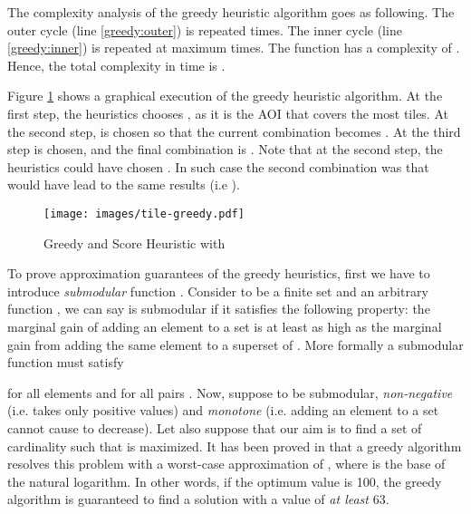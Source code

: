 \documentclass[final,10pt,a5paper]{phdimt}
\theoremstyle{definition}
\begin{document}
The complexity analysis of the greedy heuristic algorithm goes as following.
The outer cycle (line \ref{greedy:outer}) is repeated  times. 
The inner cycle (line \ref{greedy:inner}) is repeated at maximum  times. 
The function  has a complexity of .
Hence, the total complexity in time is .

Figure \ref{fig:gheur} shows a graphical execution of the greedy heuristic algorithm. At the first step, the heuristics chooses , as it is the AOI that covers the most tiles. At the second step,  is chosen so that the current combination becomes . At the third step  is chosen, and the final combination is . Note that at the second step, the heuristics could have chosen .
In such case the second combination was  that would have lead to the same results (i.e ).

\begin{figure}[tbh]
\centering
\texttt{[image: images/tile-greedy.pdf]}
\caption{Greedy and Score Heuristic with }\label{fig:gheur}
\end{figure}


To prove approximation guarantees of the greedy heuristics, first we have to introduce \textit{submodular} function \cite{nemhauser1978analysis}. 
Consider  to be a finite set and an arbitrary function , we can say  is submodular if it satisfies the following property: the marginal gain of adding an element to a set  is at least as high as the marginal gain from adding the same element to a superset of . 
More formally a submodular function must satisfy 



for all elements  and for all pairs .
Now, suppose  to be submodular, \textit{non-negative} (i.e. takes only positive values) and \textit{monotone} (i.e. adding an element to a set cannot cause  to decrease). Let also suppose that our aim is to find a set  of cardinality  such that  is maximized. It has been proved in \cite{nemhauser1978analysis} that a greedy algorithm resolves this problem with a worst-case approximation of , where  is the base of the natural logarithm. In other words, if the optimum value is 100, the greedy algorithm is guaranteed to find a solution with a value of \textit{at least} 63.
\end{document}
